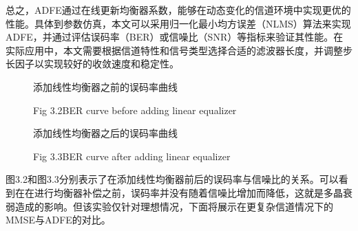 \documentclass[UTF8,a4paper,12pt]{ctexart}
\numberwithin{equation}{section}
\begin{document}
	总之，ADFE通过在线更新均衡器系数，能够在动态变化的信道环境中实现更优的性能。具体到参数仿真，本文可以采用归一化最小均方误差（NLMS）算法来实现ADFE，并通过评估误码率（BER）或信噪比（SNR）等指标来验证其性能。在实际应用中，本文需要根据信道特性和信号类型选择合适的滤波器长度，并调整步长因子以实现较好的收敛速度和稳定性。
	\begin{figure}[htb] 
		\caption{添加线性均衡器之前的误码率曲线}
		\vspace{-10pt}
		\caption*{Fig 3.2\quad BER curve before adding linear equalizer}
	\end{figure}
	\begin{figure}[htb] 
		\caption{添加线性均衡器之后的误码率曲线}
		\vspace{-10pt}
		\caption*{Fig 3.3\quad BER curve after adding linear equalizer}
	\end{figure}
	图3.2和图3.3分别表示了在添加线性均衡器前后的误码率与信噪比的关系。可以看到在在进行均衡器补偿之前，误码率并没有随着信噪比增加而降低，这就是多晶衰弱造成的影响。但该实验仅针对理想情况，下面将展示在更复杂信道情况下的MMSE与ADFE的对比。
\end{document}
